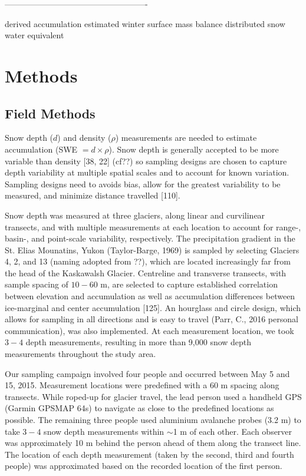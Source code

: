 \documentclass[twoside,twocolumn]{article}
\begin{document}
----------------------------------------------------

derived accumulation
estimated winter surface mass balance
distributed snow water equivalent

\pagebreak
\section{Methods}

\subsection{Field Methods}

Snow depth ($d$) and density ($\rho$) measurements are needed to estimate accumulation (SWE $= d \times \rho$). Snow depth is generally accepted to be more variable than density  [38, 22] (cf??) so sampling designs are chosen to capture depth variability at multiple spatial scales and to account for known variation. Sampling designs need to avoids bias, allow for the greatest variability to be measured, and minimize distance travelled [110].

Snow depth was measured at three glaciers, along linear and curvilinear transects, and with multiple measurements at each location to account for range-, basin-, and point-scale variability, respectively. The precipitation gradient in the St. Elias Mounatins, Yukon (Taylor-Barge, 1969) is sampled by selecting Glaciers 4, 2, and 13 (naming adopted from ??), which are located increasingly far from the head of the Kaskawalsh Glacier. Centreline and transverse transects, with sample spacing of $10-60$ m, are selected to capture established correlation between elevation and accumulation as well as accumulation differences between ice-marginal and center accumulation [125]. An hourglass and circle design, which allows for sampling in all directions and is easy to travel (Parr, C., 2016 personal communication), was also implemented. At each measurement location, we took $3-4$ depth measurements, resulting in more than 9,000 snow depth measurements throughout the study area. 

Our sampling campaign involved four people and occurred between May 5 and 15, 2015.
Measurement locations were predefined with a 60 m spacing along transects. While roped-up for glacier travel, the lead person used a handheld GPS (Garmin GPSMAP 64s) to navigate as close to the predefined locations as possible. The remaining three people used aluminium avalanche probes (3.2 m) to take $3-4$ snow depth measurements within $\sim$1 m of each other. Each observer was approximately 10 m behind the person ahead of them along the transect line. The location of each depth measurement (taken by the second, third and fourth people) was approximated based on the recorded location of the first person. 
\end{document}
